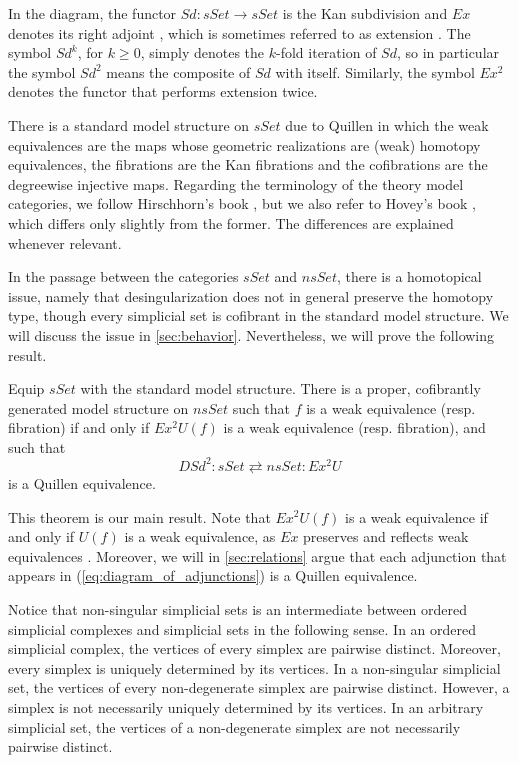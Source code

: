 In the diagram, the functor $Sd:sSet\to sSet$ is the Kan subdivision \cite[p.~147]{FP90} and $Ex$ denotes its right adjoint \cite[Prop.~4.2.10]{FP90}, which is sometimes referred to as extension \cite[p.~212]{FP90}. The symbol $Sd^k$, for $k\geq 0$, simply denotes the $k$-fold iteration of $Sd$, so in particular the symbol $Sd^2$ means the composite of $Sd$ with itself. Similarly, the symbol $Ex^2$ denotes the functor that performs extension twice.

There is a standard model structure on $sSet$ due to Quillen \cite{Qu67} in which the weak equivalences are the maps whose geometric realizations are (weak) homotopy equivalences, the fibrations are the Kan fibrations and the cofibrations are the degreewise injective maps. Regarding the terminology of the theory model categories, we follow Hirschhorn's book \cite{Hi03}, but we also refer to Hovey's book \cite{Ho99}, which differs only slightly from the former. The differences are explained whenever relevant.

In the passage between the categories $sSet$ and $nsSet$, there is a homotopical issue, namely that desingularization does not in general preserve the homotopy type, though every simplicial set is cofibrant in the standard model structure. We will discuss the issue in \cref{sec:behavior}. Nevertheless, we will prove the following result.
\begin{theorem}\label{thm:main_homotopy_theory}
Equip $sSet$ with the standard model structure. There is a proper, cofibrantly generated model structure on $nsSet$ such that $f$ is a weak equivalence (resp. fibration) if and only if $Ex^2U(f)$ is a weak equivalence (resp. fibration), and such that
\[DSd^2:sSet\rightleftarrows nsSet:Ex^2U\]
is a Quillen equivalence.
\end{theorem}
\noindent This theorem is our main result. Note that $Ex^2U(f)$ is a weak equivalence if and only if $U(f)$ is a weak equivalence, as $Ex$ preserves and reflects weak equivalences \cite[Cor.~4.6.21]{FP90}. Moreover, we will in \cref{sec:relations} argue that each adjunction that appears in (\ref{eq:diagram_of_adjunctions}) is a Quillen equivalence.

Notice that non-singular simplicial sets is an intermediate between ordered simplicial complexes and simplicial sets in the following sense. In an ordered simplicial complex, the vertices of every simplex are pairwise distinct. Moreover, every simplex is uniquely determined by its vertices. In a non-singular simplicial set, the vertices of every non-degenerate simplex are pairwise distinct. However, a simplex is not necessarily uniquely determined by its vertices. In an arbitrary simplicial set, the vertices of a non-degenerate simplex are not necessarily pairwise distinct.

